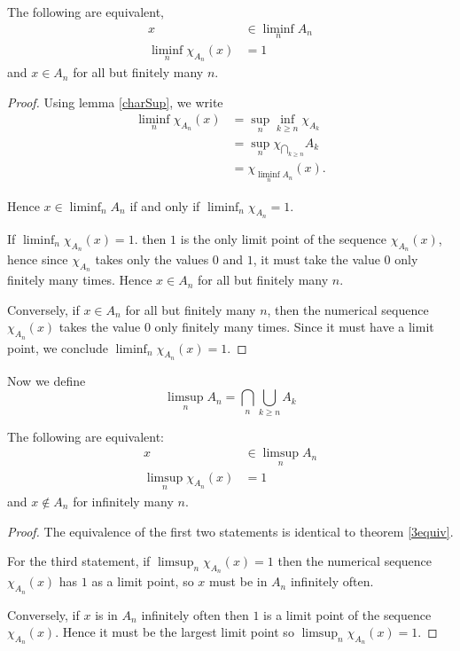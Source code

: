 \documentclass{unswmaths}
\begin{document}
    \begin{theorem}
    \label{3equiv}
        The following are equivalent,
        \begin{align*}
            x &\in \liminf_n A_n \\
            \liminf_n \chi_{A_n}(x) &= 1
        \end{align*}
        and $x \in A_n$ for all but finitely many $n$.
    \end{theorem}
    \begin{proof}
        Using lemma \ref{charSup}, we write 
        \begin{align*}
            \liminf_n \chi_{A_n}(x) &= \sup_{n} \inf_{k\geq n} \chi_{A_k}\\
            &= \sup_{n} \chi_{\bigcap_{k\geq n}} A_k\\
            &= \chi_{\liminf_n A_n}(x).
        \end{align*}
        
        
    Hence $x \in \liminf_n A_n$ if and only if $\liminf_n \chi_{A_n} = 1$.
    
    If $\liminf_n \chi_{A_n}(x) = 1$. then $1$ is the only limit point
    of the sequence $\chi_{A_n}(x)$, hence since $\chi_{A_n}$
    takes only the values $0$ and $1$, it must take the value $0$
    only finitely many times. Hence $x \in A_n$ for all but finitely many $n$.
    
    Conversely, if $x \in A_n$ for all but finitely many $n$, 
    then the numerical sequence $\chi_{A_n}(x)$ takes the value $0$
    only finitely many times. Since it must have a limit point,
    we conclude $\liminf_{n}\chi_{A_n}(x) = 1$.
    \end{proof}
    
    Now we define
    \begin{equation*}
        \limsup_n A_n = \bigcap_n \bigcup_{k\geq n} A_k
    \end{equation*}
    
    \begin{theorem}
        The following are equivalent:
        \begin{align*}
            x &\in \limsup_n A_n\\
            \limsup_{n} \chi_{A_n}(x) &= 1
        \end{align*}
        and $x \notin A_n$ for infinitely many $n$.
    \end{theorem}
    \begin{proof}
        The equivalence of the first two statements is identical
        to theorem \ref{3equiv}.
        
        For the third statement, if $\limsup_n \chi_{A_n}(x) = 1$
        then the numerical sequence $\chi_{A_n}(x)$ has $1$ as a limit point,
        so $x$ must be in $A_n$ infinitely often.
        
        Conversely, if $x$ is in $A_n$ infinitely often then $1$
        is a limit point of the sequence $\chi_{A_n}(x)$. Hence it must be the largest
        limit point so $\limsup_{n} \chi_{A_n}(x) = 1$.
    \end{proof} 
    
\end{document}
